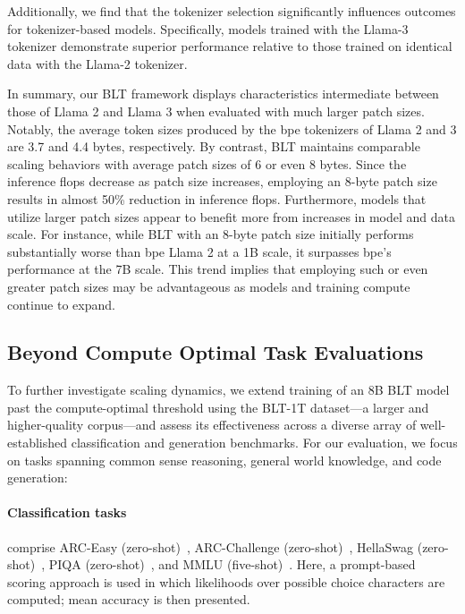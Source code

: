 Additionally, we find that the tokenizer selection significantly influences outcomes for tokenizer-based models. Specifically, models trained with the Llama-3 tokenizer demonstrate superior performance relative to those trained on identical data with the Llama-2 tokenizer.

In summary, our {\textsc BLT} framework displays characteristics intermediate between those of Llama 2 and Llama 3 when evaluated with much larger patch sizes. Notably, the average token sizes produced by the bpe tokenizers of Llama 2 and 3 are 3.7 and 4.4 bytes, respectively. By contrast, {\textsc BLT} maintains comparable scaling behaviors with average patch sizes of 6 or even 8 bytes. Since the inference flops decrease as patch size increases, employing an 8-byte patch size results in almost 50\% reduction in inference flops. Furthermore, models that utilize larger patch sizes appear to benefit more from increases in model and data scale. For instance, while {\textsc BLT} with an 8-byte patch size initially performs substantially worse than bpe Llama 2 at a 1B scale, it surpasses bpe's performance at the 7B scale. This trend implies that employing such or even greater patch sizes may be advantageous as models and training compute continue to expand.

\subsection{Beyond Compute Optimal Task Evaluations}
\label{section:evals}
To further investigate scaling dynamics, we extend training of an 8B {\textsc BLT} model past the compute-optimal threshold using the {\textsc BLT}-1T dataset—a larger and higher-quality corpus—and assess its effectiveness across a diverse array of well-established classification and generation benchmarks. For our evaluation, we focus on tasks spanning common sense reasoning, general world knowledge, and code generation:

\paragraph{Classification tasks} comprise ARC-Easy (zero-shot)~\citep{Eval_ARC}, ARC-Challenge (zero-shot)~\citep{Eval_ARC}, HellaSwag (zero-shot)~\citep{Eval_hellaswag}, PIQA (zero-shot)~\citep{Eval_piqa}, and MMLU (five-shot)~\citep{hendrycks2020measuring}. Here, a prompt-based scoring approach is used in which likelihoods over possible choice characters are computed; mean accuracy is then presented.

